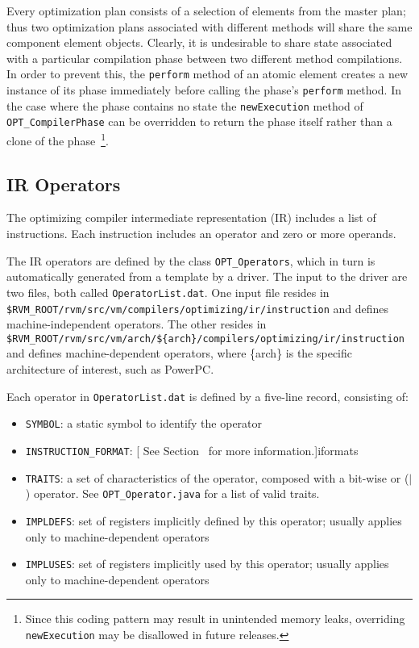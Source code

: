 Every optimization plan consists of a selection of elements from the master 
plan;
thus two optimization plans associated with different methods 
will share the same component element objects. 
Clearly, it is undesirable to share state 
associated with a particular compilation phase between two
different method compilations. In order to prevent this, the {\tt perform}
method of an atomic element creates a new instance of its phase immediately 
before calling the phase's {\tt perform} method. 
In the case where the phase
contains no state the {\tt newExecution} method of 
{\tt OPT\_CompilerPhase} can be overridden to return the phase itself rather 
than a clone of the phase~\footnote{Since this coding pattern may result
in unintended memory leaks, overriding {\tt newExecution} may be
disallowed in future releases.}.


\subsection{IR Operators}

The optimizing compiler intermediate representation (IR) includes a list
of instructions.  Each instruction includes an operator and zero or
more operands.

The IR operators are defined by the class {\tt OPT\_Operators}, which in
turn is automatically generated from a template by a driver.  The input to the
driver are two files, both called {\tt OperatorList.dat}.  One input
file resides in {\tt \$RVM\_\-ROOT/\-rvm/\-src/\-vm/\-com\-pi\-lers/\-op\-ti\-mi\-zing/\-ir/\-in\-struc\-tion} and defines machine-independent
operators.  The other resides in {\tt \$RVM\_\-ROOT/\-rvm/\-src/\-vm/\-arch/\-\$\{arch\}/com\-pi\-lers/\-op\-ti\-mi\-zing/\-ir/\-in\-struc\-tion}
and defines machine-dependent operators, where \{arch\} is the
specific architecture of interest, such as PowerPC\TMweb.

Each operator in {\tt OperatorList.dat} is defined by a five-line record,
consisting of:
\begin{itemize}
\item {\tt SYMBOL}: a static symbol to identify the operator
\item {\tt INSTRUCTION\_FORMAT}: [  See Section~\Ref{} for more information.]{iformats}
\item {\tt TRAITS}: a set of characteristics of the operator, composed with a bit-wise or ($|$) operator.  See {\tt OPT\_Operator.java} for a list of valid traits.
\item {\tt IMPLDEFS}: set of registers implicitly defined by this operator; usually applies only to machine-dependent operators
\item {\tt IMPLUSES}: set of registers implicitly used by this operator; usually applies only to machine-dependent operators
\end{itemize}

